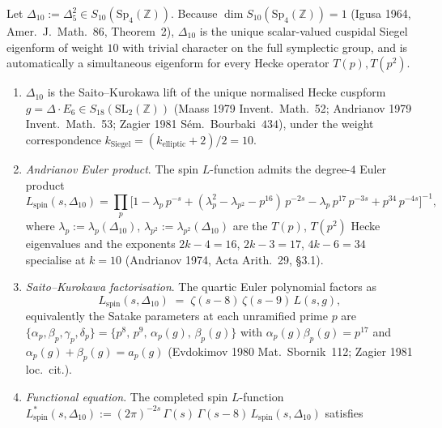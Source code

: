 \begin{proposition}
\label{prop:k3e-cy3-delta10-spin-L}
Let $\Delta_{10} := \Delta_5^2 \in S_{10}(\mathrm{Sp}_4(\mathbb{Z}))$. Because $\dim S_{10}(\mathrm{Sp}_4(\mathbb{Z})) = 1$ \textup{(}Igusa 1964, Amer.\ J.\ Math.~86, Theorem~2\textup{)}, $\Delta_{10}$ is the unique scalar-valued cuspidal Siegel eigenform of weight $10$ with trivial character on the full symplectic group, and is automatically a simultaneous eigenform for every Hecke operator $T(p), T(p^2)$.
\begin{enumerate}
\item[\textup{(i)}] $\Delta_{10}$ is the Saito--Kurokawa lift of the unique normalised Hecke cuspform $g = \Delta \cdot E_6 \in S_{18}(\mathrm{SL}_2(\mathbb{Z}))$ \textup{(}Maass 1979 Invent.~Math.~52; Andrianov 1979 Invent.~Math.~53; Zagier 1981 S\'em.\ Bourbaki~$434$\textup{)}, under the weight correspondence $k_{\mathrm{Siegel}} = (k_{\mathrm{elliptic}} + 2)/2 = 10$.
\item[\textup{(ii)}] \emph{Andrianov Euler product}. The spin $L$-function admits the degree-$4$ Euler product
\[
 L_{\mathrm{spin}}(s, \Delta_{10}) = \prod_p \bigl[ 1 - \lambda_p\, p^{-s} + (\lambda_p^2 - \lambda_{p^2} - p^{16})\, p^{-2s} - \lambda_p\, p^{17}\, p^{-3s} + p^{34}\, p^{-4s} \bigr]^{-1},
\]
where $\lambda_p := \lambda_p(\Delta_{10})$, $\lambda_{p^2} := \lambda_{p^2}(\Delta_{10})$ are the $T(p)$, $T(p^2)$ Hecke eigenvalues and the exponents $2k-4 = 16$, $2k-3 = 17$, $4k-6 = 34$ specialise at $k=10$ \textup{(}Andrianov 1974, Acta Arith.~29, \S 3.1\textup{)}.
\item[\textup{(iii)}] \emph{Saito--Kurokawa factorisation}. The quartic Euler polynomial factors as
\[
 L_{\mathrm{spin}}(s, \Delta_{10}) \;=\; \zeta(s - 8)\, \zeta(s - 9)\, L(s, g),
\]
equivalently the Satake parameters at each unramified prime $p$ are $\{\alpha_p, \beta_p, \gamma_p, \delta_p\} = \{p^8,\, p^9,\, \alpha_p(g),\, \beta_p(g)\}$ with $\alpha_p(g)\beta_p(g) = p^{17}$ and $\alpha_p(g) + \beta_p(g) = a_p(g)$ \textup{(}Evdokimov 1980 Mat.\ Sbornik~112; Zagier 1981 loc.\ cit.\textup{)}.
\item[\textup{(iv)}] \emph{Functional equation}. The completed spin $L$-function $L^*_{\mathrm{spin}}(s, \Delta_{10}) := (2\pi)^{-2s}\,\Gamma(s)\,\Gamma(s - 8)\, L_{\mathrm{spin}}(s, \Delta_{10})$ satisfies

\end{enumerate}
\end{proposition}
